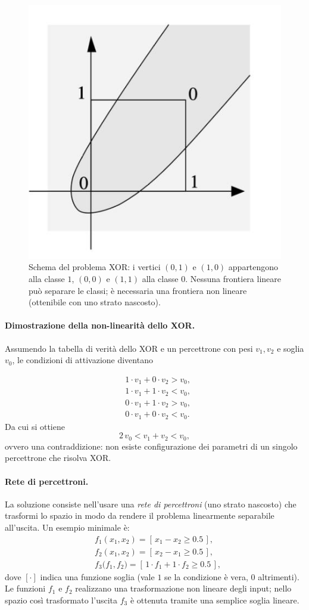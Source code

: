 \begin{figure}[htbp]
	\centering
	\includegraphics[width=.55\linewidth]{images/xor-schema.jpg}
	\caption{Schema del problema XOR: i vertici \((0,1)\) e \((1,0)\) appartengono alla classe \(1\), \((0,0)\) e \((1,1)\) alla classe \(0\). Nessuna frontiera lineare può separare le classi; è necessaria una frontiera non lineare (ottenibile con uno strato nascosto).}
	\label{fig:xor-schema}
\end{figure}

\paragraph{Dimostrazione della non-linearità dello XOR.} Assumendo la tabella di verità dello XOR e un percettrone con pesi \(v_1,v_2\) e soglia \(v_0\), le condizioni di attivazione diventano

\[
\begin{aligned}
	&1\cdot v_1 + 0\cdot v_2 > v_0,\\
	&1\cdot v_1 + 1\cdot v_2 < v_0,\\
	&0\cdot v_1 + 1\cdot v_2 > v_0,\\
	&0\cdot v_1 + 0\cdot v_2 < v_0.
\end{aligned}
\]
Da cui si ottiene
\[
2\,v_0 < v_1 + v_2 < v_0,
\]
ovvero una contraddizione: non esiste configurazione dei parametri di un singolo percettrone che risolva XOR.

\paragraph{Rete di percettroni.} La soluzione consiste nell’usare una \emph{rete di percettroni} (uno strato nascosto) che trasformi lo spazio in modo da rendere il problema linearmente separabile all’uscita. Un esempio minimale è:
\[
\begin{aligned}
	&f_1(x_1,x_2) = [\,x_1 - x_2 \ge 0.5\,],\\
	&f_2(x_1,x_2) = [\,x_2 - x_1 \ge 0.5\,],\\
	&f_3\big(f_1,f_2\big) = [\,1\cdot f_1 + 1\cdot f_2 \ge 0.5\,],
\end{aligned}
\]
dove \([\cdot]\) indica una funzione soglia (vale \(1\) se la condizione è vera, \(0\) altrimenti). Le funzioni \(f_1\) e \(f_2\) realizzano una trasformazione non lineare degli input; nello spazio così trasformato l’uscita \(f_3\) è ottenuta tramite una semplice soglia lineare.


